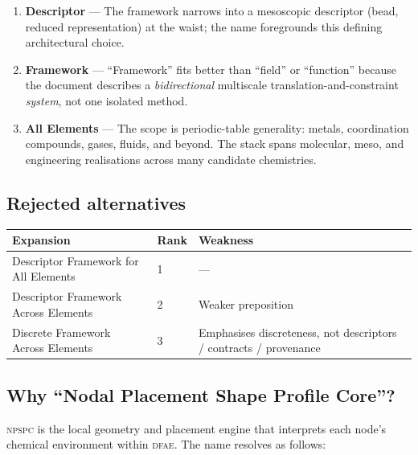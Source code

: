 \documentclass[11pt,a4paper]{article}
\theoremstyle{definition}
\theoremstyle{plain}
\newcommand{\DFAE}{\textsc{dfae}}
\newcommand{\NPSPC}{\textsc{npspc}}
\begin{document}
\begin{enumerate}[label=(\roman*)]
  \item \textbf{Descriptor} ---
        The framework narrows into a mesoscopic descriptor (bead,
        reduced representation) at the waist; the name foregrounds
        this defining architectural choice.

  \item \textbf{Framework} ---
        ``Framework'' fits better than ``field'' or ``function''
        because the document describes a \emph{bidirectional}
        multiscale translation-and-constraint \emph{system},
        not one isolated method.

  \item \textbf{All Elements} ---
        The scope is periodic-table generality: metals, coordination
        compounds, gases, fluids, and beyond.  The stack spans
        molecular, meso, and engineering realisations across many
        candidate chemistries.
\end{enumerate}

\subsection{Rejected alternatives}

\begin{center}
\begin{tabular}{@{}lll@{}}
\toprule
\textbf{Expansion} & \textbf{Rank} & \textbf{Weakness} \\
\midrule
Descriptor Framework for All Elements  & 1 & --- \\
Descriptor Framework Across Elements   & 2 & Weaker preposition \\
Discrete Framework Across Elements     & 3 & Emphasises discreteness, not
                                               descriptors / contracts / provenance \\
\bottomrule
\end{tabular}
\end{center}

\subsection{Why ``Nodal Placement Shape Profile Core''?}

\NPSPC{} is the local geometry and placement engine that interprets
each node's chemical environment within \DFAE{}.  The name resolves
as follows:
\end{document}
